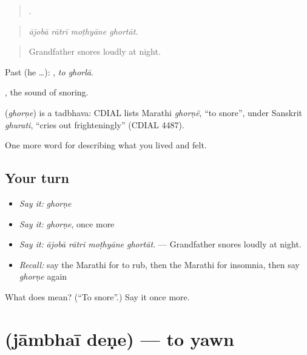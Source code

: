\begin{quote}
   .
\end{quote}

\begin{quote}
\emph{ājobā rātrī moṭhyāne ghortāt.}
\end{quote}

\begin{quote}
Grandfather snores loudly at night.
\end{quote}

Past (he …):  , \emph{to ghorlā}.

 , the sound of snoring.

\begin{cousinweb}
\textbf{} (\emph{ghorṇe}) is a tadbhava: CDIAL lists Marathi \emph{ghorṇẽ}, \textquotedblleft{}to snore\textquotedblright{}, under Sanskrit \emph{ghurati}, \textquotedblleft{}cries out frighteningly\textquotedblright{} (CDIAL 4487).
\end{cousinweb}

\begin{grammarlens}[title={What you've built}]
One more word for describing what you lived and felt.
\end{grammarlens}

\subsection*{Your turn}
\begin{itemize}
\raggedright
  \item \emph{Say it:} \emph{ghorṇe}
  \item \emph{Say it:} \emph{ghorṇe}, once more
  \item \emph{Say it:} \emph{ājobā rātrī moṭhyāne ghortāt.} — Grandfather snores loudly at night.
  \item \emph{Recall:} say the Marathi for to rub, then the Marathi for insomnia, then say \emph{ghorṇe} again
\end{itemize}

\begin{tcolorbox}[breakable,colback=teal!4,colframe=teal!35!black,title={Before you move on}]
What does  mean? (\textquotedblleft{}To snore\textquotedblright{}.) Say it once more.
\end{tcolorbox}
\section[\texorpdfstring{\mr{जांभई} \mr{देणे} (jāmbhaī deṇe)}{जांभई देणे (jāmbhaī deṇe)}]{  (jāmbhaī deṇe) — to yawn}

